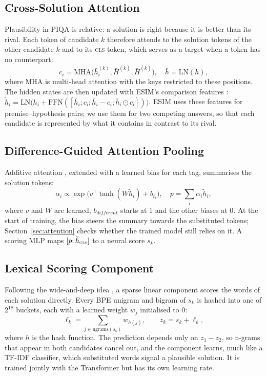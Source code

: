 \documentclass[11pt]{article}
\begin{document}
\subsection{Cross-Solution Attention}
Plausibility in PIQA is relative: a solution is right because it is better than its rival. Each token of candidate $k$ therefore attends to the solution tokens of the other candidate $\bar{k}$ and to its \textsc{cls} token, which serves as a target when a token has no counterpart:
\begin{equation}
c_i = \mathrm{MHA}\big(\bar{h}^{(k)}_i, \bar{H}^{(\bar{k})}, \bar{H}^{(\bar{k})}\big),\quad \bar{h} = \mathrm{LN}(h),
\end{equation}
where MHA is multi-head attention with the keys restricted to these positions. The hidden states are then updated with ESIM's comparison features \cite{chen2017esim}: $\tilde{h}_i = \mathrm{LN}\big(h_i + \mathrm{FFN}([\bar{h}_i; c_i; \bar{h}_i - c_i; \bar{h}_i \odot c_i])\big)$. ESIM uses these features for premise--hypothesis pairs; we use them for two competing answers, so that each candidate is represented by what it contains in contrast to its rival.

\subsection{Difference-Guided Attention Pooling}
Additive attention \cite{bahdanau2015neural}, extended with a learned bias for each tag, summarises the solution tokens:
\begin{equation}
\alpha_i \propto \exp\big(v^\top \tanh(W \tilde{h}_i) + b_{t_i}\big),\quad p = \textstyle\sum_i \alpha_i \tilde{h}_i,
\end{equation}
where $v$ and $W$ are learned, $b_{\textit{different}}$ starts at 1 and the other biases at 0. At the start of training, the bias steers the summary towards the substituted tokens; Section~\ref{sec:attention} checks whether the trained model still relies on it. A scoring MLP maps $[p; \tilde{h}_{\textsc{cls}}]$ to a neural score $s_k$.

\subsection{Lexical Scoring Component}
Following the wide-and-deep idea \cite{cheng2016wide}, a sparse linear component scores the words of each solution directly. Every BPE unigram and bigram of $s_k$ is hashed into one of $2^{18}$ buckets, each with a learned weight $w_j$ initialised to 0:
\begin{equation}
\ell_k = \textstyle\sum_{j \in \mathrm{ngrams}(s_k)} w_{h(j)},\qquad z_k = s_k + \ell_k,
\end{equation}
where $h$ is the hash function. The prediction depends only on $z_1 - z_2$, so n-grams that appear in both candidates cancel out, and the component learns, much like a TF-IDF classifier, which substituted words signal a plausible solution. It is trained jointly with the Transformer but has its own learning rate.
\end{document}
